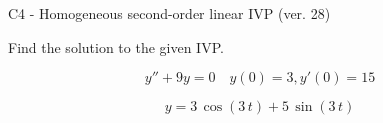 \begin{exercise}
  \begin{exerciseTitle}C4 - Homogeneous second-order linear IVP (ver. 28)\end{exerciseTitle}
  \begin{exerciseStatement}
    
Find the solution to the given IVP.

    
\[y''+9y = 0 \hspace{1em} y(0) = 3 , y'(0) = 15\]

  \end{exerciseStatement}
  \begin{exerciseAnswer}
    
\[y= 3 \, \cos\left(3 \, t\right) + 5 \, \sin\left(3 \, t\right)\]

  \end{exerciseAnswer}
\end{exercise}